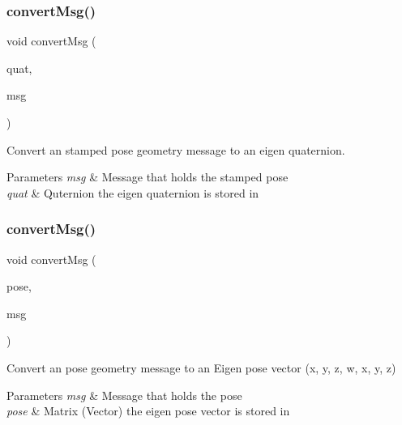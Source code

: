 \subsubsection{\texorpdfstring{convert\+Msg()}{convertMsg()}\hspace{0.1cm}{\footnotesize\ttfamily [5/14]}}
{\footnotesize\ttfamily void convert\+Msg (\begin{DoxyParamCaption}\item[{Eigen\+::\+Quaterniond \&}]{quat,  }\item[{geometry\+\_\+msgs\+::\+Pose\+Stamped \&}]{msg }\end{DoxyParamCaption})\hspace{0.3cm}{\ttfamily [inline]}}



Convert an stamped pose geometry message to an eigen quaternion. 


\begin{DoxyParams}{Parameters}
{\em msg} & Message that holds the stamped pose \\
\hline
{\em quat} & Quternion the eigen quaternion is stored in \\
\hline
\end{DoxyParams}
\mbox{\label{group__MultiRobotController_gafde5764b46f0189c2aea14ed57434708}} 
\subsubsection{\texorpdfstring{convert\+Msg()}{convertMsg()}\hspace{0.1cm}{\footnotesize\ttfamily [6/14]}}
{\footnotesize\ttfamily void convert\+Msg (\begin{DoxyParamCaption}\item[{Eigen\+::\+Matrix$<$ double, 7, 1 $>$ \&}]{pose,  }\item[{geometry\+\_\+msgs\+::\+Pose \&}]{msg }\end{DoxyParamCaption})\hspace{0.3cm}{\ttfamily [inline]}}



Convert an pose geometry message to an Eigen pose vector (x, y, z, w, x, y, z) 


\begin{DoxyParams}{Parameters}
{\em msg} & Message that holds the pose \\
\hline
{\em pose} & Matrix (Vector) the eigen pose vector is stored in \\
\hline
\end{DoxyParams}
\mbox{\label{group__MultiRobotController_ga9e842115a5f448ab0e3ba9fea93d5179}} 
